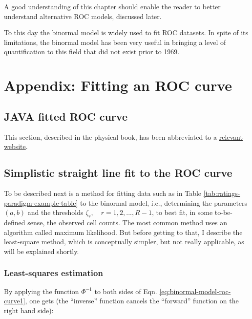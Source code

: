 \documentclass[
]{book}
\begin{document}
A good understanding of this chapter should enable the reader to better understand alternative ROC models, discussed later.

To this day the binormal model is widely used to fit ROC datasets. In spite of its limitations, the binormal model has been very useful in bringing a level of quantification to this field that did not exist prior to 1969.

\hypertarget{binormal-model-curve-fitting}{%
\section{Appendix: Fitting an ROC curve}\label{binormal-model-curve-fitting}}

\hypertarget{java-fitted-roc-curve}{%
\subsection{JAVA fitted ROC curve}\label{java-fitted-roc-curve}}

This section, described in the physical book, has been abbreviated to a \href{http://www.rad.jhmi.edu/jeng/javarad/roc/JROCFITi.html}{relevant website}.

\hypertarget{simplistic-straight-line-fit-to-the-roc-curve}{%
\subsection{Simplistic straight line fit to the ROC curve}\label{simplistic-straight-line-fit-to-the-roc-curve}}

To be described next is a method for fitting data such as in Table \ref{tab:ratings-paradigm-example-table} to the binormal model, i.e., determining the parameters \((a,b)\) and the thresholds \(\zeta_r , \quad r = 1, 2, ..., R-1\), to best fit, in some to-be-defined sense, the observed cell counts. The most common method uses an algorithm called maximum likelihood. But before getting to that, I describe the least-square method, which is conceptually simpler, but not really applicable, as will be explained shortly.

\hypertarget{least-squares-estimation}{%
\subsubsection{Least-squares estimation}\label{least-squares-estimation}}

By applying the function \(\Phi^{-1}\) to both sides of Eqn. \eqref{eq:binormal-model-roc-curve1}, one gets (the ``inverse'' function cancels the ``forward'' function on the right hand side):
\end{document}
